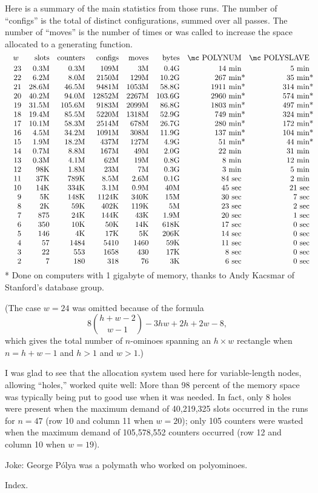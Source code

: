 Here is a summary of the main statistics from those runs. The number of
``configs'' is the total of distinct configurations, summed over all passes.
The number of ``moves'' is the number of times  or  was
called to increase the space allocated to a generating function.
$$\vbox{\halign{&\quad\hfil#\cr
$w\ $&slots&counters&configs&moves&bytes&\mc POLYNUM&\mc POLYSLAVE\cr
\noalign{\vskip2pt}
23&    0.3M&    0.3M&   109M&   3M&  0.4G&     14 min&        5 min\cr
22&    6.2M&    8.0M&  2150M& 129M& 10.2G&    267 min\rlap*& 35 min\rlap*\cr
21&   28.6M&   46.5M&  9481M&1053M& 58.8G&   1911 min\rlap*&314 min\rlap*\cr
20&   40.2M&   94.0M& 12852M&2267M&103.6G&   2960 min\rlap*&574 min\rlap*\cr
19&   31.5M&  105.6M&  9183M&2099M& 86.8G&   1803 min\rlap*&497 min\rlap*\cr
18&   19.4M&   85.5M&  5220M&1318M& 52.9G&    749 min\rlap*&324 min\rlap*\cr
17&   10.1M&   58.3M&  2514M& 678M& 26.7G&    280 min\rlap*&172 min\rlap*\cr
16&    4.5M&   34.2M&  1091M& 308M& 11.9G&    137 min\rlap*&104 min\rlap*\cr
15&    1.9M&   18.2M&   437M& 127M&  4.9G&     51 min\rlap*& 44 min\rlap*\cr
14&    0.7M&    8.8M&   167M&  49M&  2.0G&     22 min&       31 min\cr
13&    0.3M&    4.1M&    62M&  19M&  0.8G&      8 min&       12 min\cr
12&     98K&    1.8M&    23M&   7M&  0.3G&      3 min&        5 min\cr
11&     37K&    789K&   8.5M& 2.6M&  0.1G&     84 sec&        2 min\cr
10&     14K&    334K&   3.1M& 0.9M&   40M&     45 sec&       21 sec\cr
9&      5K&    148K&  1124K& 340K&   15M&     30 sec&        7 sec\cr
8&      2K&     59K&   402K& 119K&    5M&     23 sec&        2 sec\cr
7&     875&     24K&   144K&  43K&  1.9M&     20 sec&        1 sec\cr
6&     350&     10K&    50K&  14K&  618K&     17 sec&        0 sec\cr
5&     146&      4K&    17K&   5K&  206K&     14 sec&        0 sec\cr
4&      57&    1484&   5410& 1460&   59K&     11 sec&        0 sec\cr
3&      22&     553&   1658&  430&   17K&      8 sec&        0 sec\cr
2&       7&     180&    318&   76&    3K&      6 sec&        0 sec\cr
}}$$
* Done on computers with 1 gigabyte of memory, thanks to
Andy Kacsmar of Stanford's database group.

\smallskip\noindent (The case $w=24$ was omitted because of the formula
$$
8{h+w-2\choose w-1}-3hw+2h+2w-8,
$$
which gives the total number of $n$-ominoes spanning an $h\times w$
rectangle when $n=h+w-1$ and $h>1$ and $w>1$.)

\fi

I was glad to see that the allocation system used here for
variable-length
nodes, allowing ``holes,'' worked quite well: More than 98 percent of
the memory space was typically being put to good use when it was needed.
In fact, only 8 holes were present when the maximum demand of 40,219,325
slots occurred in the runs for $n=47$ (row 10 and column 11
when $w=20$); only 105 counters were wasted when the maximum demand of
105,578,552 counters occurred (row 12 and column 10 when $w=19$).

\fi

Joke: George P\'olya was a polymath who worked on polyominoes.

\fi

Index.
\fi

\inx
\fin
\con
